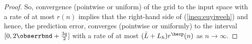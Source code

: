 \begin{proof}
So, convergence (pointwise or uniform) of the grid to the input space with a rate of at most $r(n)$ implies that the right-hand side of (\ref{ineq:euyiweeh}) and hence, the prediction error,  
converges (pointwise or uniformly) to the interval $[0,2 \obserrbnd + \frac {3q}{2}] $ with a rate of at most $(\bar L + L_h) r^\hexp(n)$ as $n \to  \infty$.



%
%
%
%
%
%

\end{proof}








